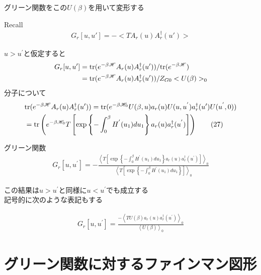 \documentclass[dvipdfmx,11pt]{beamer}
\begin{document}
\begin{frame}
    グリーン関数をこの$U(\beta)$を用いて変形する
    \begin{block}{Recall}
        \begin{align}
            G_r[u,u'] = -<TA_r(u)A_r^{\dagger}(u')> \tag{1}
        \end{align}
    \end{block}
    $u>u^{'}$と仮定すると
    \begin{align*}
        G_r[u,u'] &= {\rm tr}(e^{-\beta\mathscr{H}}A_r(u)A_r^{\dagger}(u'))/{\rm tr}(e^{-\beta\mathscr{H}})\nonumber\\
        &= {\rm tr}(e^{-\beta\mathscr{H}}A_r(u)A_r^{\dagger}(u'))/Z_{G0}<U(\beta)>_0 \nonumber
    \end{align*}
    分子について
    \begin{align*}
        &{\rm tr}(e^{-\beta\mathscr{H}}A_r(u)A_r^{\dagger}(u')) = {\rm tr}(e^{-\beta\mathscr{H}_0}U(\beta,u)a_r(u)U(u,u^{'})a_r^{\dagger}(u')U(u^{'},0)) \nonumber\\
        &= {\rm tr}\left(e^{-\beta\mathscr{H}_0}T\left[\exp\left\{-\int_0^{\beta}H^{'}(u_1)du_1\right\}a_r(u)a_r^{\dagger}(u^{'})\right]\right) \tag{27}
    \end{align*}
\end{frame}
\begin{frame}
    \begin{block}{グリーン関数}
        \begin{align*}
            G_r[u,u^{'}] = -\frac{\left<T\left[\exp\left\{-\int_0^{\beta}H^{'}(u_1)du_1\right\}a_r(u)a_r^{\dagger}(u^{'})\right]\right>_0}{\left<T\left[\exp\left\{-\int_0^{\beta}H^{'}(u_1)du_1\right\}\right]\right>_0} \tag{28}
        \end{align*}
    \end{block}
    この結果は$u>u^{'}$と同様に$u<u^{'}$でも成立する\\
    記号的に次のような表記もする
    \begin{block}{}
        \begin{align*}
            G_r[u,u^{'}] = \frac{-\left<TU(\beta)a_r(u)a_r^{\dagger}(u^{'})\right>_0}{\left<U(\beta)\right>_0} \tag{29}
        \end{align*}
    \end{block}
\end{frame}


\section{グリーン関数に対するファインマン図形}
\end{document}
